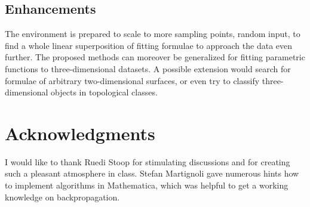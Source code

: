 \documentclass[useAMS,usenatbib]{templates/mn2e}
\begin{document}
\subsection{Enhancements}
The environment is prepared to scale to more sampling points, random
input, to find a whole linear superposition of fitting formulae to
approach the data even further. The proposed methods can moreover be
generalized for fitting parametric functions to three-dimensional
datasets. A possible extension would search for formulae of arbitrary
two-dimensional surfaces, or even try to classify three-dimensional
objects in topological classes.

\section{Acknowledgments}
\label{sec:Acknowledgments}
%
I would like to thank Ruedi Stoop for stimulating discussions and for
creating such a pleasant atmosphere in class. Stefan Martignoli gave
numerous hints how to implement algorithms in {\sc Mathematica}, which
was helpful to get a working knowledge on backpropagation.

%
%

%
%
%
%
%
%
%

%
\label{lastpage}
\end{document}
